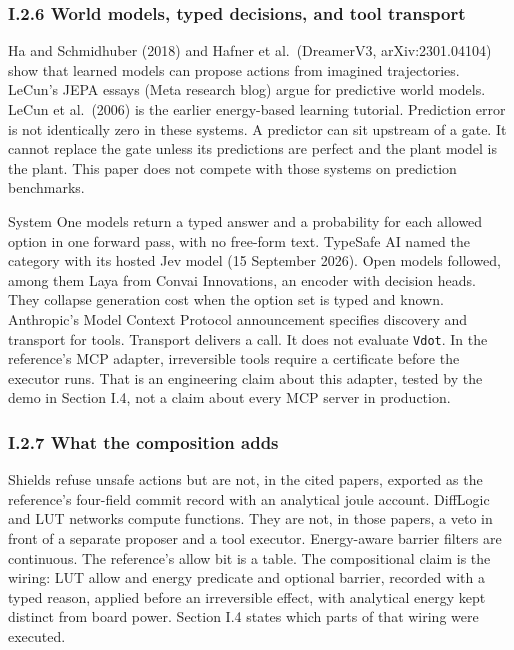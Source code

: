 \documentclass[
  10pt,
]{article}
\begin{document}
\subsubsection{I.2.6 World models, typed decisions, and tool
transport}\label{i.2.6-world-models-typed-decisions-and-tool-transport}

Ha and Schmidhuber (2018) and Hafner et al.~(DreamerV3,
arXiv:2301.04104) show that learned models can propose actions from
imagined trajectories. LeCun's JEPA essays (Meta research blog) argue
for predictive world models. LeCun et al.~(2006) is the earlier
energy-based learning tutorial. Prediction error is not identically zero
in these systems. A predictor can sit upstream of a gate. It cannot
replace the gate unless its predictions are perfect and the plant model
is the plant. This paper does not compete with those systems on
prediction benchmarks.

System One models return a typed answer and a probability for each
allowed option in one forward pass, with no free-form text. TypeSafe AI
named the category with its hosted Jev model (15 September 2026). Open
models followed, among them Laya from Convai Innovations, an encoder
with decision heads. They collapse generation cost when the option set
is typed and known. Anthropic's Model Context Protocol announcement
specifies discovery and transport for tools. Transport delivers a call.
It does not evaluate \texttt{Vdot}. In the reference's MCP adapter,
irreversible tools require a certificate before the executor runs. That
is an engineering claim about this adapter, tested by the demo in
Section I.4, not a claim about every MCP server in production.

\subsubsection{I.2.7 What the composition
adds}\label{i.2.7-what-the-composition-adds}

Shields refuse unsafe actions but are not, in the cited papers, exported
as the reference's four-field commit record with an analytical joule
account. DiffLogic and LUT networks compute functions. They are not, in
those papers, a veto in front of a separate proposer and a tool
executor. Energy-aware barrier filters are continuous. The reference's
allow bit is a table. The compositional claim is the wiring: LUT allow
and energy predicate and optional barrier, recorded with a typed reason,
applied before an irreversible effect, with analytical energy kept
distinct from board power. Section I.4 states which parts of that wiring
were executed.
\end{document}
